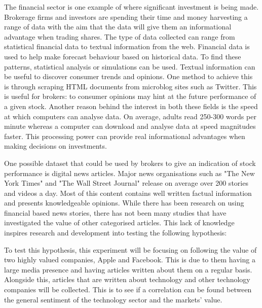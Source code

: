 \documentclass[a4paper,11pt]{report}
\begin{document}
The financial sector is one example of where significant investment is being made. Brokerage firms and investors are spending their time and money harvesting a range of data with the aim that the data will give them an informational advantage when trading shares. The type of data collected can range from statistical financial data to textual information from the web. Financial data is used to help make forecast behaviour based on historical data. To find these patterns, statistical analysis or simulations can be used. Textual information can be useful to discover consumer trends and opinions. One method to achieve this is through scraping HTML documents from microblog sites such as Twitter. This is useful for brokers: to consumer opinions may hint at the future performance of a given stock. Another reason behind the interest in both these fields is the speed at which computers can analyse data. On average, adults read 250-300 words per minute whereas a computer can download and analyse data at speed magnitudes faster. This processing power can provide real informational advantages when making decisions on investments.

One possible dataset that could be used by brokers to give an indication of stock performance is digital news articles. Major news organisations such as "The New York Times" and "The Wall Street Journal" release on average over 200 stories and videos a day. Most of this content contains well written factual information and presents knowledgeable opinions. While there has been research on using financial based news stories, there has not been many studies that have investigated the value of other categorised articles. This lack of knowledge inspires research and development into testing the following hypothesis:\\

\noindent{}

\clearpage

To test this hypothesis, this experiment will be focusing on following the value of two highly valued companies, Apple and Facebook. This is due to them having a large media presence and having articles written about them on a regular basis. Alongside this, articles that are written about technology and other technology companies will be collected. This is to see if a correlation can be found between the general sentiment of the technology sector and the markets' value.
\end{document}
